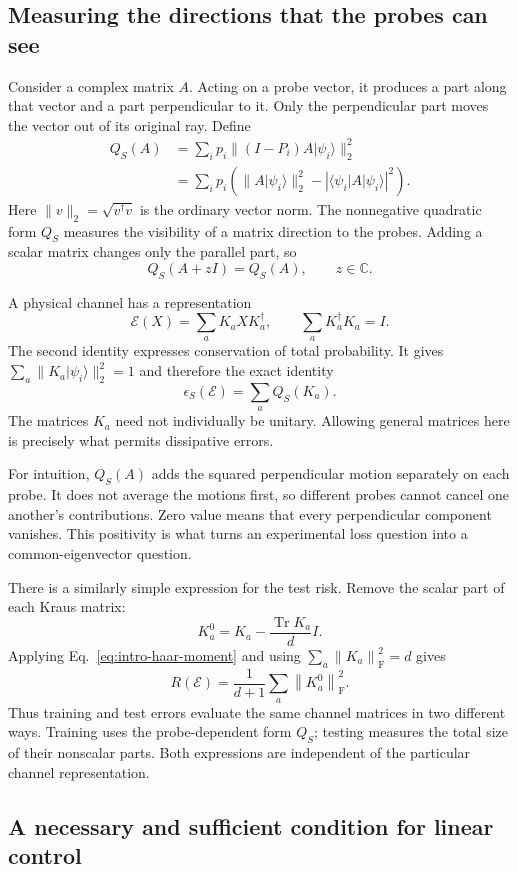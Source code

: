 \documentclass[11pt,a4paper]{article}
\newcommand{\ket}[1]{\lvert #1\rangle}
\newcommand{\bra}[1]{\langle #1\rvert}
\newcommand{\Tr}{\operatorname{Tr}}
\newcommand{\normF}[1]{\left\lVert #1\right\rVert_{\mathrm F}}
\numberwithin{equation}{section}
\begin{document}
\subsection{Measuring the directions that the probes can see}

Consider a complex matrix $A$. Acting on a probe vector, it produces a part along that vector and a part perpendicular to it. Only the perpendicular part moves the vector out of its original ray. Define
\begin{align}
Q_S(A)
&=\sum_i p_i\|(I-P_i)A\ket{\psi_i}\|_2^2 \\
&=\sum_i p_i\left(\|A\ket{\psi_i}\|_2^2
       -|\bra{\psi_i}A\ket{\psi_i}|^2\right).
\end{align}
Here $\|v\|_2=\sqrt{v^\dagger v}$ is the ordinary vector norm. The nonnegative quadratic form $Q_S$ measures the visibility of a matrix direction to the probes. Adding a scalar matrix changes only the parallel part, so
\[
Q_S(A+zI)=Q_S(A),\qquad z\in\mathbb C.
\]

A physical channel has a representation
\[
\mathcal E(X)=\sum_a K_aXK_a^\dagger,
\qquad \sum_aK_a^\dagger K_a=I.
\]
The second identity expresses conservation of total probability. It gives $\sum_a\|K_a\ket{\psi_i}\|_2^2=1$ and therefore the exact identity
\[
\boxed{\epsilon_S(\mathcal E)=\sum_aQ_S(K_a).}
\]
The matrices $K_a$ need not individually be unitary. Allowing general matrices here is precisely what permits dissipative errors.

For intuition, $Q_S(A)$ adds the squared perpendicular motion separately on each probe. It does not average the motions first, so different probes cannot cancel one another's contributions. Zero value means that every perpendicular component vanishes. This positivity is what turns an experimental loss question into a common-eigenvector question. 

There is a similarly simple expression for the test risk. Remove the scalar part of each Kraus matrix:
\[
K_a^0=K_a-\frac{\Tr K_a}{d}I.
\]
Applying Eq.~\eqref{eq:intro-haar-moment} and using $\sum_a\normF{K_a}^2=d$ gives
\[
\boxed{R(\mathcal E)=\frac{1}{d+1}\sum_a\normF{K_a^0}^2.}
\]
Thus training and test errors evaluate the same channel matrices in two different ways. Training uses the probe-dependent form $Q_S$; testing measures the total size of their nonscalar parts. Both expressions are independent of the particular channel representation.

\subsection{A necessary and sufficient condition for linear control}
\end{document}
